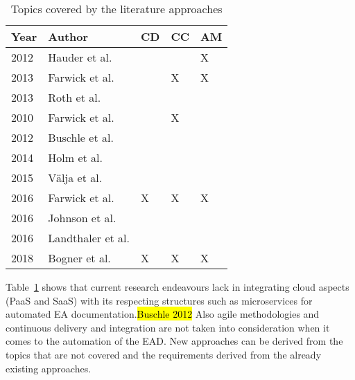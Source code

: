 \begin{table}[htpb]
  \caption[Topics covered by the literature approaches]{Topics covered by the literature approaches}\label{tab:literature-summary}
  \centering
  \begin{tabular}{l l l l l}
    \toprule
      Year & Author & CD & CC & AM\\
    \midrule
      2012 & Hauder et al. &   &   & X\\
      2013 & Farwick et al. &   & X & X\\
      2013 & Roth et al. &   &   &  \\
      2010 & Farwick et al. &   & X &  \\
      2012 & Buschle et al. &   &   &  \\
      2014 & Holm et al. &   &   &  \\
      2015 & Välja et al. &   &   &  \\
      2016 & Farwick et al. & X & X & X\\
      2016 & Johnson et al. &   &   &  \\
      2016 & Landthaler et al. &   &   &  \\
      2018 & Bogner et al. & X & X & X\\
    \bottomrule
  \end{tabular}
\end{table}

Table~\ref{tab:literature-summary} shows that current research endeavours lack in integrating cloud aspects (PaaS and SaaS) with its respecting structures such as microservices for automated EA documentation.\hl{Buschle 2012} Also agile methodologies and continuous delivery and integration are not taken into consideration when it comes to the automation of the EAD. New approaches can be derived from the topics that are not covered and the requirements derived from the already existing approaches.


